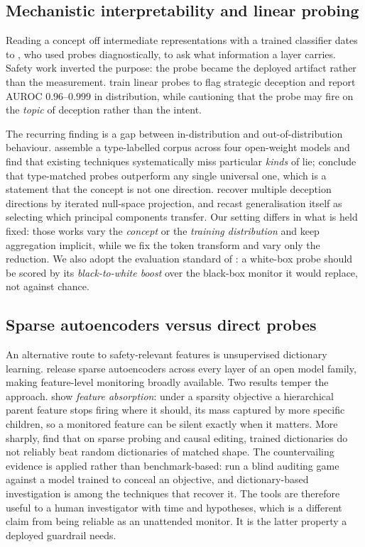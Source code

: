 \documentclass[10pt]{article}
\theoremstyle{plain}
\theoremstyle{definition}
\theoremstyle{remark}
\begin{document}
\subsection{Mechanistic interpretability and linear probing}
Reading a concept off intermediate representations with a trained classifier dates to
\citet{alain2016probes}, who used probes diagnostically, to ask what information a layer
carries. Safety work inverted the purpose: the probe became the deployed artifact rather
than the measurement. \citet{goldowskydill2025deception} train linear probes to flag
strategic deception and report AUROC $0.96$--$0.999$ in distribution, while cautioning that
the probe may fire on the \emph{topic} of deception rather than the intent.

The recurring finding is a gap between in-distribution and out-of-distribution behaviour.
\citet{kretschmar2026liars} assemble a type-labelled corpus across four open-weight models
and find that existing techniques systematically miss particular \emph{kinds} of lie;
\citet{natarajan2026oneprobe} conclude that type-matched probes outperform any single
universal one, which is a statement that the concept is not one direction.
\citet{boxo2025caught} recover multiple deception directions by iterated null-space
projection, and \citet{yoo2026subspace} recast generalisation itself as selecting which
principal components transfer. Our setting differs in what is held fixed: those works vary
the \emph{concept} or the \emph{training distribution} and keep aggregation implicit, while
we fix the token transform and vary only the reduction. We also adopt the evaluation
standard of \citet{parrack2026blacktowhite}: a white-box probe should be scored by its
\emph{black-to-white boost} over the black-box monitor it would replace, not against chance.

\subsection{Sparse autoencoders versus direct probes}
An alternative route to safety-relevant features is unsupervised dictionary learning.
\citet{lieberum2024gemmascope} release sparse autoencoders across every layer of an
open model family, making feature-level monitoring broadly available. Two results temper
the approach. \citet{chanin2024absorption} show \emph{feature absorption}: under a sparsity
objective a hierarchical parent feature stops firing where it should, its mass captured by
more specific children, so a monitored feature can be silent exactly when it matters. More
sharply, \citet{korznikov2026sanity} find that on sparse probing and causal editing, trained
dictionaries do not reliably beat random dictionaries of matched shape. The countervailing
evidence is applied rather than benchmark-based: \citet{marks2025auditing} run a blind
auditing game against a model trained to conceal an objective, and dictionary-based
investigation is among the techniques that recover it. The tools are therefore useful to a
human investigator with time and hypotheses, which is a different claim from being reliable
as an unattended monitor. It is the latter property a deployed guardrail needs.
\end{document}
